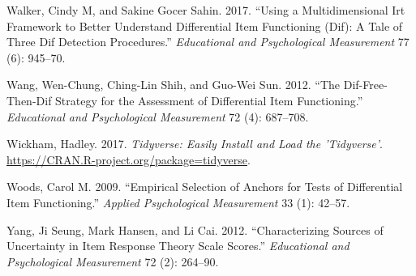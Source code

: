 \documentclass[
  11pt,
]{article}
\begin{document}
\leavevmode\hypertarget{ref-walker2017using}{}%
Walker, Cindy M, and Sakine Gocer Sahin. 2017. ``Using a Multidimensional Irt Framework to Better Understand Differential Item Functioning (Dif): A Tale of Three Dif Detection Procedures.'' \emph{Educational and Psychological Measurement} 77 (6): 945--70.

\leavevmode\hypertarget{ref-wang2012dif}{}%
Wang, Wen-Chung, Ching-Lin Shih, and Guo-Wei Sun. 2012. ``The Dif-Free-Then-Dif Strategy for the Assessment of Differential Item Functioning.'' \emph{Educational and Psychological Measurement} 72 (4): 687--708.

\leavevmode\hypertarget{ref-tidy}{}%
Wickham, Hadley. 2017. \emph{Tidyverse: Easily Install and Load the 'Tidyverse'}. \url{https://CRAN.R-project.org/package=tidyverse}.

\leavevmode\hypertarget{ref-woods2009empirical}{}%
Woods, Carol M. 2009. ``Empirical Selection of Anchors for Tests of Differential Item Functioning.'' \emph{Applied Psychological Measurement} 33 (1): 42--57.

\leavevmode\hypertarget{ref-yang2012characterizing}{}%
Yang, Ji Seung, Mark Hansen, and Li Cai. 2012. ``Characterizing Sources of Uncertainty in Item Response Theory Scale Scores.'' \emph{Educational and Psychological Measurement} 72 (2): 264--90.
\end{document}
